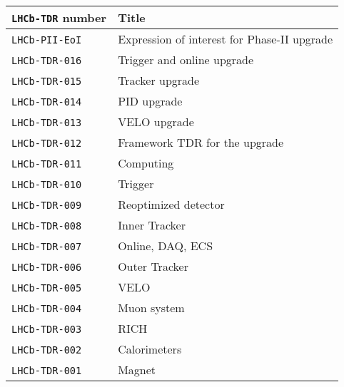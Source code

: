 \begin{center}
  \begin{tabular}{ll}
    \hline
    \texttt{LHCb-TDR} number & Title \\
    \hline
    \texttt{LHCb-PII-EoI}~\cite{LHCb-PII-EoI} &
    {\small Expression of interest for Phase-II upgrade} \\
    \texttt{LHCb-TDR-016}~\cite{LHCb-TDR-016} &
    {\small Trigger and online upgrade} \\
    \texttt{LHCb-TDR-015}~\cite{LHCb-TDR-015} &
    {\small Tracker upgrade} \\
    \texttt{LHCb-TDR-014}~\cite{LHCb-TDR-014} &
    {\small PID upgrade} \\
    \texttt{LHCb-TDR-013}~\cite{LHCb-TDR-013} &
    {\small VELO upgrade} \\
    \texttt{LHCb-TDR-012}~\cite{LHCb-TDR-012} &
    {\small Framework TDR for the upgrade} \\
    \texttt{LHCb-TDR-011}~\cite{LHCb-TDR-011} &
    {\small Computing} \\
    \texttt{LHCb-TDR-010}~\cite{LHCb-TDR-010} &
    {\small Trigger} \\
    \texttt{LHCb-TDR-009}~\cite{LHCb-TDR-009} &
    {\small Reoptimized detector} \\
    \texttt{LHCb-TDR-008}~\cite{LHCb-TDR-008} &
    {\small Inner Tracker} \\
    \texttt{LHCb-TDR-007}~\cite{LHCb-TDR-007} &
    {\small Online, DAQ, ECS} \\
    \texttt{LHCb-TDR-006}~\cite{LHCb-TDR-006} &
    {\small Outer Tracker} \\
    \texttt{LHCb-TDR-005}~\cite{LHCb-TDR-005} &
    {\small VELO} \\
    \texttt{LHCb-TDR-004}~\cite{LHCb-TDR-004} &
    {\small Muon system} \\
    \texttt{LHCb-TDR-003}~\cite{LHCb-TDR-003} &
    {\small RICH} \\
    \texttt{LHCb-TDR-002}~\cite{LHCb-TDR-002} &
    {\small Calorimeters} \\
    \texttt{LHCb-TDR-001}~\cite{LHCb-TDR-001} &
    {\small Magnet} \\
    \hline
  \end{tabular}
\end{center}

